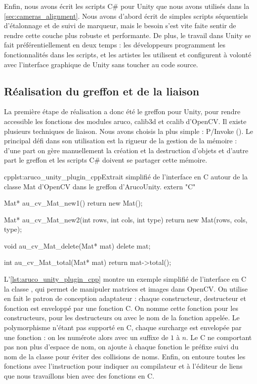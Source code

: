 Enfin, nous avons écrit les scripts C\# pour Unity que nous avons utilisés dans la \autoref{sec:cameras_alignment}. Nous avons d'abord écrit de simples scripts séquentiels d'étalonnage et de suivi de marqueur, mais le besoin s'est vite faite sentir de rendre cette couche plus robuste et performante. De plus, le travail dans Unity se fait préférentiellement en deux temps : les développeurs programment les fonctionnalités dans les scripts, et les artistes les utilisent et configurent à volonté avec l'interface graphique de Unity sans toucher au code source.

\subsection{Réalisation du greffon et de la liaison}
La première étape de réalisation a donc été le greffon pour Unity, pour rendre accessible les fonctions des modules aruco, calib3d et ccalib d'OpenCV. Il existe plusieurs techniques de liaison. Nous avons choisis la plus simple : P/Invoke (). Le principal défi dans son utilisation est la rigueur de la gestion de la mémoire : d'une part on gère manuellement la création et la destruction d'objets et d'autre part le greffon et les scripts C\# doivent se partager cette mémoire.

\begin{listingETS}{cpp}{lst:aruco_unity_plugin_cpp}{Extrait simplifié de l'interface en C autour de la classe Mat d'OpenCV dans le greffon d'ArucoUnity.}
  extern "C" {
    Mat* au_cv_Mat_new1() {
      return new Mat();
    }

    Mat* au_cv_Mat_new2(int rows, int cols, int type) {
      return new Mat(rows, cols, type);
    }
    
    void au_cv_Mat_delete(Mat* mat) {
      delete mat;
    }

    int au_cv_Mat_total(Mat* mat) {
      return mat->total();
    }
  }
\end{listingETS}

L'\autoref{lst:aruco_unity_plugin_cpp} montre un exemple simplifié de l'interface en C la classe , qui permet de manipuler matrices et images dans OpenCV. On utilise en fait le patron de conception adaptateur : chaque constructeur, destructeur et fonction est enveloppé par une fonction C. On nomme cette fonction  pour les constructeurs,  pour les destructeurs ou avec le nom de la fonction appelée. Le polymorphisme n'étant pas supporté en C, chaque surcharge est envelopée par une fonction : on les numérote alors avec un suffixe de $1$ à $n$. Le C ne comportant pas non plus d'espace de nom, on ajoute à chaque fonction le préfixe  suivi du nom de la classe pour éviter des collisions de noms. Enfin, on entoure toutes les fonctions avec l'instruction  pour indiquer au compilateur et à l'éditeur de liens que nous travaillons bien avec des fonctions en C.

